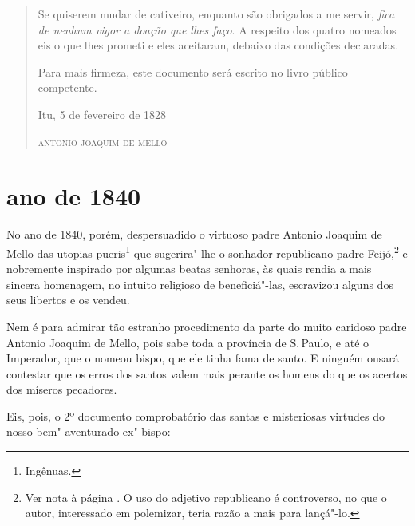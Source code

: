\begin{quote}
Se quiserem mudar de cativeiro, enquanto são obrigados a me servir,
\emph{fica de nenhum vigor a doação que lhes faço}. A respeito dos
quatro nomeados eis o que lhes prometi e eles aceitaram, debaixo das
condições declaradas.

Para mais firmeza, este documento será escrito no livro público
competente.\smallskip

\noindent{}Itu, 5 de fevereiro de 1828

\noindent\textsc{antonio joaquim de mello}

\noindent{}
\end{quote}


\section*{ano de 1840}

No ano de 1840, porém, despersuadido o virtuoso padre Antonio Joaquim de
Mello das utopias pueris\footnote{Ingênuas.} que sugerira"-lhe o
sonhador republicano padre Feijó,\footnote{Ver nota à página \pageref{feijo}. O uso do
  adjetivo republicano é controverso, no que o autor, interessado em
  polemizar, teria razão a mais para lançá"-lo.} e nobremente inspirado
por algumas beatas senhoras, às quais rendia a mais sincera homenagem,
no intuito religioso de beneficiá"-las, escravizou alguns dos seus
libertos e os vendeu.

Nem é para admirar tão estranho procedimento da parte do muito caridoso
padre Antonio Joaquim de Mello, pois sabe toda a província de S.\,Paulo,
e até o Imperador, que o nomeou bispo, que ele tinha fama de santo. E
ninguém ousará contestar que os erros dos santos valem mais perante os
homens do que os acertos dos míseros pecadores.

Eis, pois, o 2º documento comprobatório das santas e misteriosas
virtudes do nosso bem"-aventurado ex"-bispo:

